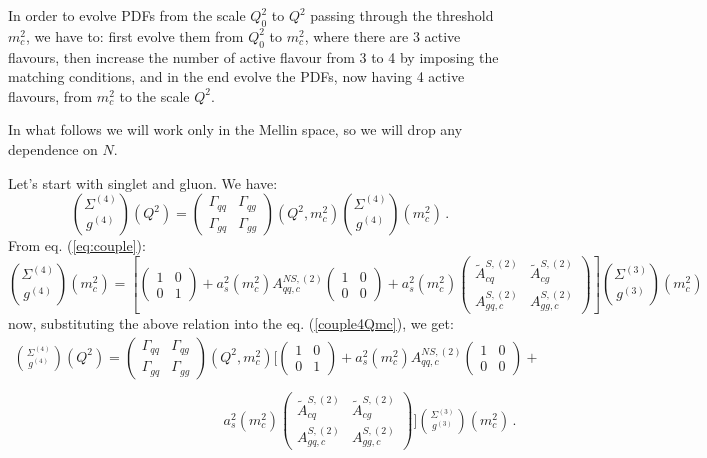 \documentclass[10pt,a4paper]{article}
\begin{document}
In order to evolve PDFs from the scale $Q_0^2$ to $Q^2$ passing
through the threshold $m_c^2$, we have to: first evolve them from
$Q^2_0$ to $m_c^2$, where there are 3 active flavours, then increase
the number of active flavour from 3 to 4 by imposing the matching
conditions, and in the end evolve the PDFs, now having 4 active
flavours, from $m_c^2$ to the scale $Q^2$.

In what follows we will work only in the Mellin space, so we will drop
any dependence on $N$.

Let's start with singlet and gluon. We have:
\begin{equation}
{\Sigma^{(4)} \choose g^{(4)}}(Q^2) = \begin{pmatrix} \Gamma_{qq} &
  \Gamma_{qg} \\ \Gamma_{gq}&
  \Gamma_{gg}\end{pmatrix}(Q^2,m_c^2){\Sigma^{(4)} \choose
  g^{(4)}}(m_c^2)\,.
\label{couple4Qmc}
\end{equation}
From eq. (\ref{eq:couple}):
\begin{equation}
\displaystyle {\Sigma^{(4)} \choose g^{(4)}}(m_c^2)=\left[\begin{pmatrix} 1 & 0 \\ 0 & 1\end{pmatrix}+a_s^2(m_c^2)A_{qq,c}^{N\!S,(2)}\begin{pmatrix} 1 & 0 \\ 0 & 0\end{pmatrix}+a_s^2(m_c^2)\begin{pmatrix} \tilde{A}^{S,(2)}_{cq} & \tilde{A}^{S,(2)}_{cg} \\A^{S,(2)}_{gq,c} & A_{gg,c}^{S,(2)}\end{pmatrix}\right]{\Sigma^{(3)} \choose g^{(3)}}(m_c^2)
\end{equation}
now, substituting the above relation into the eq. (\ref{couple4Qmc}),
we get:
\begin{equation}
\begin{array}{l}
\displaystyle {\Sigma^{(4)} \choose g^{(4)}}(Q^2) = \begin{pmatrix} \Gamma_{qq} & \Gamma_{qg} \\ \Gamma_{gq}& \Gamma_{gg}\end{pmatrix}(Q^2,m_c^2)\Bigg[\begin{pmatrix} 1 & 0 \\ 0 & 1\end{pmatrix}+a_s^2(m_c^2)A_{qq,c}^{N\!S,(2)}\begin{pmatrix} 1 & 0 \\ 0 & 0\end{pmatrix}+\\
\\
\hspace{180pt}\displaystyle a_s^2(m_c^2)\begin{pmatrix} \tilde{A}^{S,(2)}_{cq} & \tilde{A}^{S,(2)}_{cg} \\A^{S,(2)}_{gq,c} & A_{gg,c}^{S,(2)}\end{pmatrix}\Bigg]{\Sigma^{(3)} \choose g^{(3)}}(m_c^2)\,.
\end{array}
\label{couple43Qmc}
\end{equation}
\end{document}
